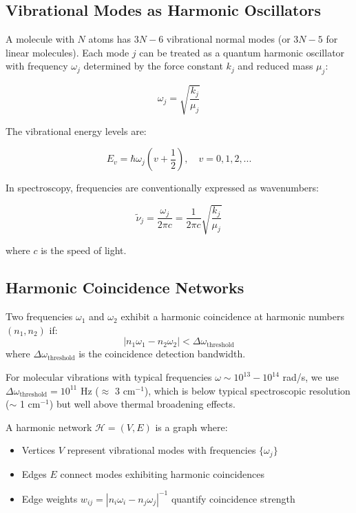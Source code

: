 
\subsection{Vibrational Modes as Harmonic Oscillators}

A molecule with $N$ atoms has $3N-6$ vibrational normal modes (or $3N-5$ for linear molecules). Each mode $j$ can be treated as a quantum harmonic oscillator with frequency $\omega_j$ determined by the force constant $k_j$ and reduced mass $\mu_j$:

\begin{equation}
\omega_j = \sqrt{\frac{k_j}{\mu_j}}
\end{equation}

The vibrational energy levels are:

\begin{equation}
E_v = \hbar\omega_j\left(v + \frac{1}{2}\right), \quad v = 0, 1, 2, ...
\end{equation}

In spectroscopy, frequencies are conventionally expressed as wavenumbers:

\begin{equation}
\tilde{\nu}_j = \frac{\omega_j}{2\pi c} = \frac{1}{2\pi c}\sqrt{\frac{k_j}{\mu_j}}
\end{equation}

where $c$ is the speed of light.

\subsection{Harmonic Coincidence Networks}

\begin{definition}
Two frequencies $\omega_1$ and $\omega_2$ exhibit a harmonic coincidence at harmonic numbers $(n_1, n_2)$ if:
\begin{equation}
|n_1\omega_1 - n_2\omega_2| < \Delta\omega_{\text{threshold}}
\end{equation}
where $\Delta\omega_{\text{threshold}}$ is the coincidence detection bandwidth.
\end{definition}

For molecular vibrations with typical frequencies $\omega \sim 10^{13}-10^{14}$ rad/s, we use $\Delta\omega_{\text{threshold}} = 10^{11}$ Hz ($\approx$ 3 cm$^{-1}$), which is below typical spectroscopic resolution ($\sim$ 1 cm$^{-1}$) but well above thermal broadening effects.

\begin{definition}
A harmonic network $\mathcal{H} = (V, E)$ is a graph where:
\begin{itemize}
\item Vertices $V$ represent vibrational modes with frequencies $\{\omega_j\}$
\item Edges $E$ connect modes exhibiting harmonic coincidences
\item Edge weights $w_{ij} = |n_i\omega_i - n_j\omega_j|^{-1}$ quantify coincidence strength
\end{itemize}
\end{definition}

